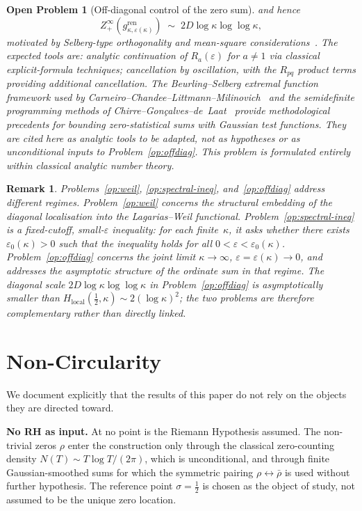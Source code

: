 \documentclass[11pt]{article}
\newtheorem*{remark}{Remark}
\newtheorem{openproblem}[theorem]{Open Problem}
\newcommand{\Hlocal}{H_{\mathrm{local}}}
\begin{document}
\begin{openproblem}[Off-diagonal control of the zero sum]
and hence
\[
Z_+^{\infty}(g^{\mathrm{ren}}_{\kappa,\varepsilon(\kappa)})
\;\sim\; 2D\log\kappa\log\log\kappa,
\]
motivated by Selberg-type orthogonality and mean-square
considerations~\cite{Selberg}.
The expected tools are: analytic continuation of
$R_a(\varepsilon)$ for $a\ne 1$ via classical
explicit-formula techniques; cancellation by oscillation, with
the $R_{pq}$ product terms providing additional cancellation.
The Beurling--Selberg extremal function framework used by
Carneiro--Chandee--Littmann--Milinovich~\cite{CCLM17}
and the semidefinite programming methods of
Chirre--Gon\c{c}alves--de~Laat~\cite{CGdL20}
provide methodological precedents for bounding
zero-statistical sums with Gaussian test functions.
They are cited here as analytic tools to be adapted,
not as hypotheses or as unconditional inputs to
Problem~\ref{op:offdiag}.
This problem is formulated entirely within classical analytic
number theory.
\end{openproblem}

\begin{remark}
Problems~\ref{op:weil}, \ref{op:spectral-ineq},
and~\ref{op:offdiag} address
different regimes.
Problem~\ref{op:weil} concerns the structural embedding of the
diagonal localisation into the Lagarias--Weil functional.
Problem~\ref{op:spectral-ineq} is a fixed-cutoff, small-$\varepsilon$
inequality: for each finite~$\kappa$, it asks whether there exists
$\varepsilon_0(\kappa)>0$ such that the inequality holds for all
$0<\varepsilon<\varepsilon_0(\kappa)$.
Problem~\ref{op:offdiag} concerns the joint limit
$\kappa\to\infty$, $\varepsilon=\varepsilon(\kappa)\to 0$, and
addresses the asymptotic structure of the ordinate sum in that
regime.
The diagonal scale $2D\log\kappa\log\log\kappa$ in
Problem~\ref{op:offdiag} is asymptotically smaller than
$\Hlocal(\tfrac12,\kappa)\sim 2(\log\kappa)^2$; the two
problems are therefore complementary rather than directly
linked.
\end{remark}

\section*{Non-Circularity}
\label{sec:nocirc}

We document explicitly that the results of this paper do not
rely on the objects they are directed toward.

\textbf{No RH as input.}
At no point is the Riemann Hypothesis assumed.
The non-trivial zeros $\rho$ enter the construction only through
the classical zero-counting density $N(T)\sim T\log T/(2\pi)$,
which is unconditional, and through finite Gaussian-smoothed
sums for which the symmetric pairing $\rho\leftrightarrow\bar\rho$
is used without further hypothesis.
The reference point $\sigma=\tfrac12$ is chosen as the object
of study, not assumed to be the unique zero location.
\end{document}
